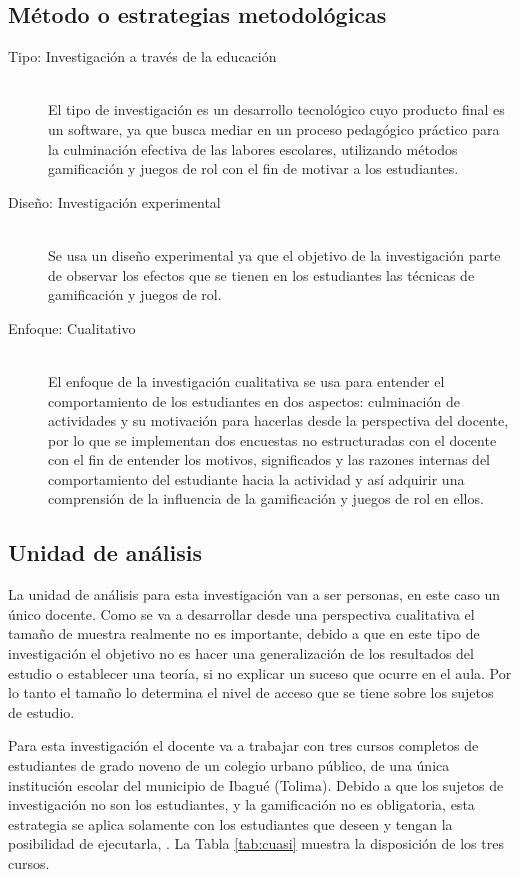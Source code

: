 \subsection{Método o estrategias metodológicas}	

\begin{description}
\item[Tipo: Investigación a través de la educación] \hfill \\ El tipo de investigación es un 
desarrollo tecnológico cuyo producto final es un software, ya que busca mediar en un proceso pedagógico 
práctico para la culminación efectiva de las labores escolares, utilizando métodos gamificación y juegos de 
rol con el fin de motivar a los estudiantes.
\item[Diseño: Investigación experimental] \hfill \\ Se usa un diseño experimental ya que el objetivo 
de la investigación parte de observar los efectos que se tienen en los estudiantes las técnicas de 
gamificación y juegos de rol.
\item[Enfoque: Cualitativo] \hfill \\ El enfoque de la investigación cualitativa se usa para entender 
el comportamiento de los estudiantes en dos aspectos: culminación de actividades y su motivación para hacerlas 
desde la perspectiva del docente, por lo que se implementan dos encuestas no estructuradas con el docente con 
el fin de entender los motivos, significados y las razones internas del comportamiento del estudiante hacia la 
actividad y así adquirir una comprensión de la influencia de la gamificación y juegos de rol en ellos.
\end{description}

\subsection{Unidad de análisis}

La unidad de análisis para esta investigación van a ser personas, en este caso un único docente. Como se va a
desarrollar desde una perspectiva cualitativa el tamaño de muestra realmente no es importante, debido a que en 
este tipo de investigación el objetivo no es hacer una generalización de los resultados del estudio o 
establecer una teoría, si no explicar un suceso que ocurre en el aula. Por lo tanto el tamaño lo determina el 
nivel de acceso que se tiene sobre los sujetos de estudio.

Para esta investigación el docente va a trabajar con tres cursos completos de estudiantes de grado noveno de 
un colegio urbano público, de una única institución escolar del municipio de Ibagué (Tolima). Debido a que los 
sujetos de investigación no son los estudiantes, y la gamificación no es obligatoria, esta estrategia se  
aplica solamente con los estudiantes que deseen y tengan la posibilidad de ejecutarla, . La Tabla 
\ref{tab:cuasi} muestra la disposición de los tres cursos.

